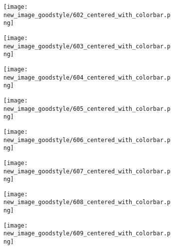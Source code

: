 \documentclass[a4paper,12pt]{article}
\begin{document}
\begin{figure}[H]
  \begin{subfigure}{0.11\textwidth}
    \texttt{[image: new\_image\_goodstyle/602\_centered\_with\_colorbar.png]}
  \end{subfigure}
  \hfill
  \begin{subfigure}{0.11\textwidth}
    \texttt{[image: new\_image\_goodstyle/603\_centered\_with\_colorbar.png]}
  \end{subfigure}
  \hfill
  \begin{subfigure}{0.11\textwidth}
    \texttt{[image: new\_image\_goodstyle/604\_centered\_with\_colorbar.png]}
  \end{subfigure}
  \hfill
  \begin{subfigure}{0.11\textwidth}
    \texttt{[image: new\_image\_goodstyle/605\_centered\_with\_colorbar.png]}
  \end{subfigure}
  \hfill
  \begin{subfigure}{0.11\textwidth}
    \texttt{[image: new\_image\_goodstyle/606\_centered\_with\_colorbar.png]}
  \end{subfigure}
  \hfill
  \begin{subfigure}{0.11\textwidth}
    \texttt{[image: new\_image\_goodstyle/607\_centered\_with\_colorbar.png]}
  \end{subfigure}
  \hfill
  \begin{subfigure}{0.11\textwidth}
    \texttt{[image: new\_image\_goodstyle/608\_centered\_with\_colorbar.png]}
  \end{subfigure}
  \hfill
  \begin{subfigure}{0.11\textwidth}
    \texttt{[image: new\_image\_goodstyle/609\_centered\_with\_colorbar.png]}
  \end{subfigure}
  \hfill
\end{figure}
\end{document}
